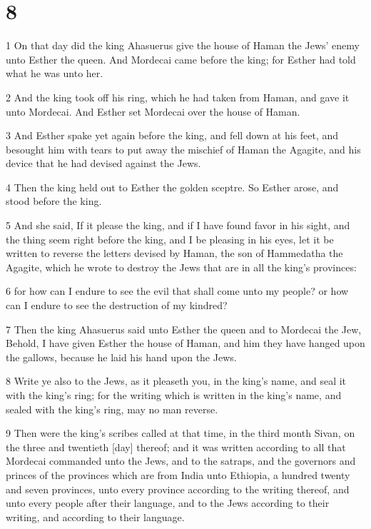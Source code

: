 \chapter{8}

\par 1 On that day did the king Ahasuerus give the house of Haman the Jews' enemy unto Esther the queen. And Mordecai came before the king; for Esther had told what he was unto her.
\par 2 And the king took off his ring, which he had taken from Haman, and gave it unto Mordecai. And Esther set Mordecai over the house of Haman.
\par 3 And Esther spake yet again before the king, and fell down at his feet, and besought him with tears to put away the mischief of Haman the Agagite, and his device that he had devised against the Jews.
\par 4 Then the king held out to Esther the golden sceptre. So Esther arose, and stood before the king.
\par 5 And she said, If it please the king, and if I have found favor in his sight, and the thing seem right before the king, and I be pleasing in his eyes, let it be written to reverse the letters devised by Haman, the son of Hammedatha the Agagite, which he wrote to destroy the Jews that are in all the king's provinces:
\par 6 for how can I endure to see the evil that shall come unto my people? or how can I endure to see the destruction of my kindred?
\par 7 Then the king Ahasuerus said unto Esther the queen and to Mordecai the Jew, Behold, I have given Esther the house of Haman, and him they have hanged upon the gallows, because he laid his hand upon the Jews.
\par 8 Write ye also to the Jews, as it pleaseth you, in the king's name, and seal it with the king's ring; for the writing which is written in the king's name, and sealed with the king's ring, may no man reverse.
\par 9 Then were the king's scribes called at that time, in the third month Sivan, on the three and twentieth [day] thereof; and it was written according to all that Mordecai commanded unto the Jews, and to the satraps, and the governors and princes of the provinces which are from India unto Ethiopia, a hundred twenty and seven provinces, unto every province according to the writing thereof, and unto every people after their language, and to the Jews according to their writing, and according to their language.
